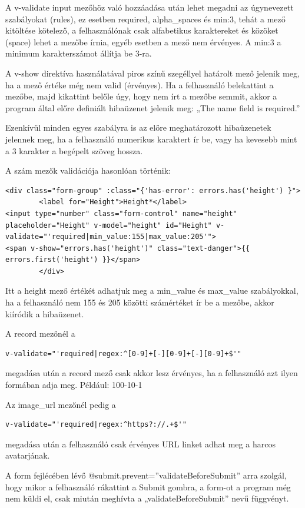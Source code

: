 A v-validate input mezőhöz való hozzáadása után lehet megadni az úgynevezett szabályokat (rules), ez esetben required, alpha\_spaces és min:3, tehát a mező kitöltése kötelező, a felhasználónak csak alfabetikus karaktereket és közöket (space) lehet a mezőbe írnia, egyéb esetben a mező nem érvényes. A min:3 a minimum karakterszámot állítja be 3-ra.

A v-show direktíva használatával piros színű szegéllyel határolt mező jelenik meg, ha a mező értéke még nem valid (érvényes). Ha a felhasználó belekattint a mezőbe, majd kikattint belőle úgy, hogy nem írt a mezőbe semmit, akkor a program által előre definiált hibaüzenet jelenik meg: „The name field is required.”

Ezenkívül minden egyes szabályra is az előre meghatározott hibaüzenetek jelennek meg, ha a felhasználó numerikus karaktert ír be, vagy ha kevesebb mint a 3 karakter a begépelt szöveg hossza.

A szám mezők validációja hasonlóan történik:

\begin{verbatim}
<div class="form-group" :class="{'has-error': errors.has('height') }">
       	<label for="Height">Height*</label>
<input type="number" class="form-control" name="height" placeholder="Height" v-model="height" id="Height" v-validate="'required|min_value:155|max_value:205'">
<span v-show="errors.has('height')" class="text-danger">{{ errors.first('height') }}</span>
        </div>
\end{verbatim}

Itt a height mező értékét adhatjuk meg a min\_value és max\_value szabályokkal, ha a felhasználó nem 155 és 205 közötti számértéket ír be a mezőbe, akkor kiíródik a hibaüzenet.

A record mezőnél a
\begin{verbatim}
v-validate="'required|regex:^[0-9]+[-][0-9]+[-][0-9]+$'"
\end{verbatim}
megadása után a record mező csak akkor lesz érvényes, ha a felhasználó azt ilyen formában adja meg. Például: 100-10-1

Az image\_url mezőnél pedig a
\begin{verbatim}
v-validate="'required|regex:^https?://.+$'"
\end{verbatim}
megadása után a felhasználó csak érvényes URL linket adhat meg a harcos avatarjának.

A form fejlécében lévő @submit.prevent=”validateBeforeSubmit” arra szolgál, hogy mikor a felhasználó rákattint a Submit gombra, a form-ot a program még nem küldi el, csak miután meghívta a „validateBeforeSubmit” nevű függvényt.

